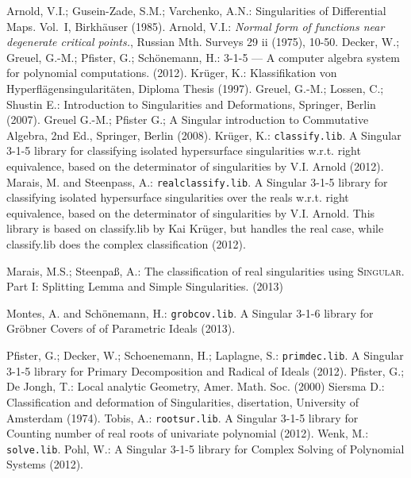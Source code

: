 \documentclass[noend]{amsproc}
\theoremstyle{definition}
\begin{document}
 \begin{thebibliography}{99}
 Arnold, V.I.; Gusein-Zade, S.M.; Varchenko, A.N.:
Singularities of Differential Maps. Vol.~I, Birkh\"auser (1985).
 Arnold, V.I.:
\textit{Normal form of functions near degenerate critical points.},
Russian Mth. Surveys 29 ii (1975), 10-50.
Decker, W.; Greuel, G.-M.; Pfister, G.; Sch{\"o}nemann, H.:
 {3-1-5} --- {A} computer algebra system for polynomial
computations.
 (2012).
 Kr\"uger, K.: Klassifikation von
Hyperfl\"agensingularit\"aten, Diploma Thesis (1997).
Greuel, G.-M.; Lossen, C.; Shustin E.:
Introduction to Singularities and Deformations, Springer, Berlin (2007).
 Greuel G.-M.; Pfister G.;
A Singular introduction to Commutative Algebra, 2nd Ed., Springer,
Berlin (2008).
Kr\"uger, K.:
{\tt classify.lib}. {A} {\sc Singular} {3-1-5} library for classifying isolated
hypersurface singularities w.r.t. right equivalence, based on the determinator
of singularities by V.I. Arnold (2012).
Marais, M. and Steenpass, A.:
{\tt realclassify.lib}. {A} {\sc Singular} {3-1-5} library for classifying
isolated hypersurface singularities over the reals w.r.t. right equivalence,
based on the determinator of singularities by V.I. Arnold. This library is
based on classify.lib by Kai Kr\"uger, but handles the real case, while
classify.lib does the complex classification (2012).

Marais, M.S.; Steenpa\ss, A.:
The classification of real singularities using \textsc{Singular}. Part I: Splitting Lemma and Simple Singularities. (2013)

Montes, A. and Sch\"onemann, H.:
{\tt grobcov.lib}. {A} {\sc Singular} {3-1-6} library for Gr\"obner Covers of
of Parametric Ideals (2013).

 Pfister, G.; Decker, W.;  Schoenemann, H.; Laplagne, S.:
{\tt primdec.lib}. {A} {\sc Singular} {3-1-5} library for Primary Decomposition
and Radical of Ideals (2012).
Pfister, G.; De Jongh, T.:
Local analytic Geometry, Amer. Math. Soc. (2000)
 Siersma D.: Classification and deformation of Singularities,
disertation, University of Amsterdam (1974).
Tobis, A.:
{\tt rootsur.lib}. {A} {\sc Singular} {3-1-5} library for Counting number of
real roots of univariate polynomial (2012).
 Wenk, M.: {\tt solve.lib}. Pohl, W.:
{A} {\sc Singular} {3-1-5} library for Complex Solving of Polynomial Systems
(2012).

\end{thebibliography}
\end{document}
